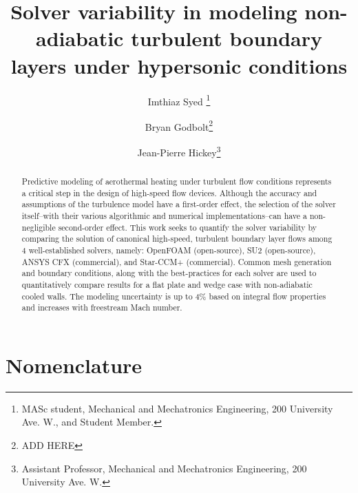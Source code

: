 \documentclass[journal ]{new-aiaa}
\title{Solver variability in modeling non-adiabatic turbulent boundary layers  under hypersonic conditions}
\author{Imthiaz Syed \footnote{MASc student, Mechanical and Mechatronics Engineering, 200 University Ave. W., and Student Member.} }
\affil{University of Waterloo, Waterloo, Ontario, Canada}
\author{Bryan Godbolt\footnote{ADD HERE}}
\affil{Unmanned Vehicle Applied Dynamics (UVAD), Medicine Hat, Alberta}
\author{Jean-Pierre Hickey\footnote{Assistant Professor, Mechanical and Mechatronics Engineering, 200 University Ave. W.}}
\affil{University of Waterloo, Waterloo, Ontario, Canada}
\begin{document}
\maketitle

\begin{abstract}
Predictive modeling of aerothermal heating under turbulent flow conditions represents a critical step in the design of high-speed flow devices. Although the accuracy and assumptions of the turbulence model have a first-order effect, the selection of the solver itself--with their various algorithmic and numerical implementations--can have a non-negligible second-order effect. This work seeks to quantify the solver variability by comparing the solution of canonical high-speed, turbulent boundary layer flows among 4 well-established solvers, namely: OpenFOAM (open-source), SU2 (open-source), ANSYS CFX (commercial), and Star-CCM+ (commercial). Common mesh generation and boundary conditions, along with the best-practices for each solver are used to quantitatively compare results for a flat plate and wedge case with non-adiabatic cooled walls. The modeling uncertainty is up to 4\% based on integral flow properties and increases with freestream Mach number. 

\end{abstract}

\section*{Nomenclature}

\end{document}
